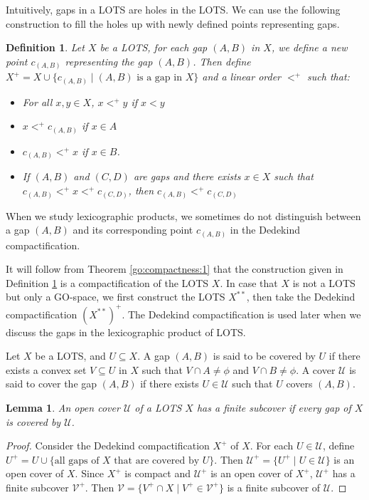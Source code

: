 \documentclass[12pt,oneside,english]{amsbook}
\numberwithin{equation}{section} %
\numberwithin{figure}{section} %
\theoremstyle{plain}
\numberwithin{section}{chapter}
\theoremstyle{plain}
\newtheorem{lem}[thm]{Lemma}
\newtheorem{defn}[thm]{Definition}
\begin{document}
Intuitively, gaps in a LOTS are holes in the LOTS. We can use the following construction to fill the holes up with newly defined points representing gaps.  
\begin{defn}\label{dedekind}
  Let $X$ be a LOTS, for each gap $(A, B)$ in $X$, we define a new point $c_{(A,B)}$ representing the gap $(A,B)$. Then define $X^{+} = X \cup \{c_{(A,B)} \;| \; (A,B) \text{ is a gap in } X \}$ and a linear order $<^+$ such that:
  \begin{itemize}
  \item For all $x,y \in X$, $x <^+ y$ if $ x < y$
  \item $x <^+ c_{(A,B)}$ if $x \in A$
  \item $c_{(A,B)} <^+ x$ if $x \in B$.
  \item If $(A,B)$ and $(C,D)$ are gaps and there exists $x \in X$ such that $c_{(A,B)} <^+ x <^+ c_{(C,D)}$, then $c_{(A,B)} <^+ c_{(C,D)}$
  \end{itemize}
\end{defn}
When we study lexicographic products, we sometimes do not distinguish between a gap $(A,B)$ and its corresponding point $c_{(A,B)}$ in the Dedekind compactification.

It will follow from Theorem \ref{go:compactness:1} that the construction given in Definition \ref{dedekind} is a compactification of the LOTS $X$. In case that $X$ is not a LOTS but only a GO-space, we first construct the LOTS $X^{**}$, then take the Dedekind compactification $(X^{**})^{+}$. The Dedekind compactification is used later when we discuss the gaps in the lexicographic product of LOTS.

Let $X$ be a LOTS, and $U \subseteq X$. A gap $(A,B)$ is said to be covered by $U$ if there exists a convex set $V \subseteq U$ in $X$ such that $V \cap A \neq \phi$ and $V \cap B \neq \phi$. A cover $\mathcal{U}$ is said to cover the gap $(A,B)$ if there exists $U \in \mathcal{U}$ such that $U$ covers $(A,B)$. 

\begin{lem}
  An open cover $\mathcal{U}$ of a LOTS $X$ has a finite subcover if every gap of $X$ is covered by $\mathcal{U}$.
\end{lem}
\begin{proof}
  Consider the Dedekind compactification $X^+$ of $X$. For each $U \in \mathcal{U}$, define $U^+ = U \cup\{\text{all gaps of } X \text{ that are covered by } U\}.$ Then $\mathcal{U}^+ = \{ U^+ \; | \; U \in \mathcal{U}\}$ is an open cover of $X$. Since $X^+$ is compact and $\mathcal{U}^+$ is an open cover of $X^+$, $\mathcal{U}^+$ has a finite subcover $\mathcal{V}^+$. Then $\mathcal{V} = \{V^+ \cap X \; | \; V^+ \in \mathcal{V}^+ \}$ is a finite subcover of $\mathcal{U}$.
\end{proof}
\end{document}
